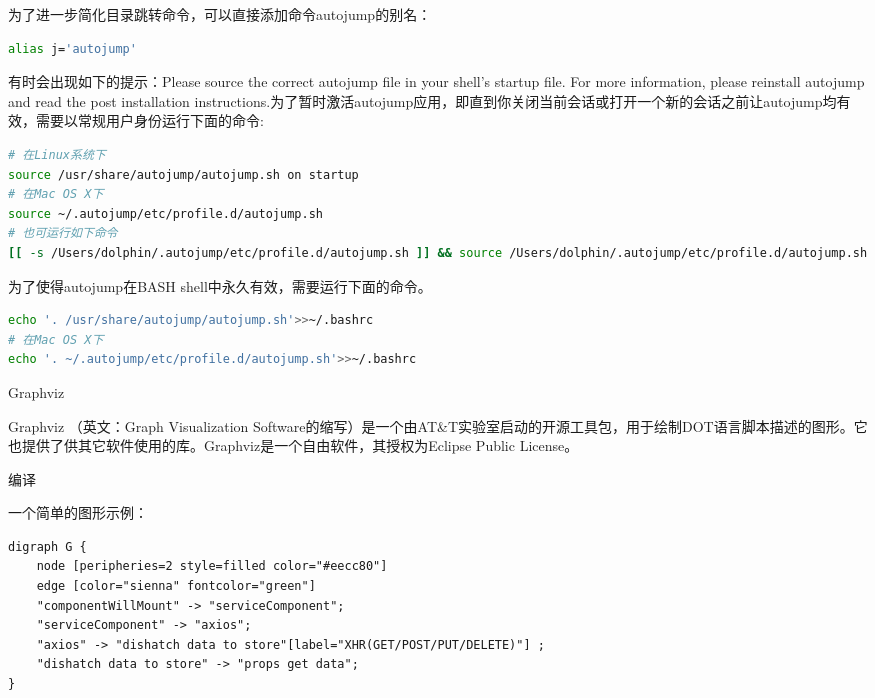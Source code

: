 \documentclass[12pt]{book}
\makeatletter
\numberwithin{dummy}{section}
\theoremstyle{ocrenumbox}
\theoremstyle{blacknumex}
\theoremstyle{blacknumbox}
\theoremstyle{ocrenum}
\renewcommand{\section}{\@startsection{section}{1}{\z@}
	{-4ex \@plus -1ex \@minus -.4ex}
	{1ex \@plus.2ex }
	{\normalfont\large\sffamily\bfseries}}
\renewcommand{\subsection}{\@startsection {subsection}{2}{\z@}
	{-3ex \@plus -0.1ex \@minus -.4ex}
	{0.5ex \@plus.2ex }
	{\normalfont\sffamily\bfseries}}
\makeatother
\begin{document}
为了进一步简化目录跳转命令，可以直接添加命令autojump的别名：

\begin{lstlisting}[language=Bash]
alias j='autojump'
\end{lstlisting}

有时会出现如下的提示：Please source the correct autojump file in your shell's startup file. For more information, please reinstall autojump and read the post installation instructions.为了暂时激活autojump应用，即直到你关闭当前会话或打开一个新的会话之前让autojump均有效，需要以常规用户身份运行下面的命令:

\begin{lstlisting}[language=Bash]
# 在Linux系统下
source /usr/share/autojump/autojump.sh on startup
# 在Mac OS X下
source ~/.autojump/etc/profile.d/autojump.sh
# 也可运行如下命令
[[ -s /Users/dolphin/.autojump/etc/profile.d/autojump.sh ]] && source /Users/dolphin/.autojump/etc/profile.d/autojump.sh
\end{lstlisting}

为了使得autojump在BASH shell中永久有效，需要运行下面的命令。

\begin{lstlisting}[language=Bash]
echo '. /usr/share/autojump/autojump.sh'>>~/.bashrc
# 在Mac OS X下
echo '. ~/.autojump/etc/profile.d/autojump.sh'>>~/.bashrc
\end{lstlisting}

\section{Graphviz}

Graphviz （英文：Graph Visualization Software的缩写）是一个由AT\&T实验室启动的开源工具包，用于绘制DOT语言脚本描述的图形。它也提供了供其它软件使用的库。Graphviz是一个自由软件，其授权为Eclipse Public License。

\subsection{编译}

一个简单的图形示例：

\begin{lstlisting}
digraph G {
	node [peripheries=2 style=filled color="#eecc80"]
	edge [color="sienna" fontcolor="green"]
	"componentWillMount" -> "serviceComponent";
	"serviceComponent" -> "axios";
	"axios" -> "dishatch data to store"[label="XHR(GET/POST/PUT/DELETE)"] ;
	"dishatch data to store" -> "props get data";
}
\end{lstlisting}
\end{document}
